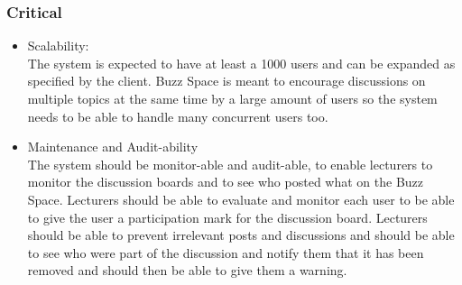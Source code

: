 
	\subsubsection{Critical}
		\begin{itemize}
			\item Scalability: \\
			The system is expected to have at least a 1000 users and can be expanded as specified by the client. Buzz Space is meant to encourage discussions on multiple topics at the same time by a large amount of users so the system needs to be able to handle many concurrent users too.
			\item Maintenance and Audit-ability \\
			The system should be monitor-able and audit-able, to enable lecturers to monitor the discussion boards and to see who posted what on the Buzz Space. Lecturers should be able to evaluate and monitor each user to be able to give the user a participation mark for the discussion board. Lecturers should be able to prevent irrelevant posts and discussions and should be able to see who were part of the discussion and notify them that it has been removed and should then be able to give them a warning.
		\end{itemize}
